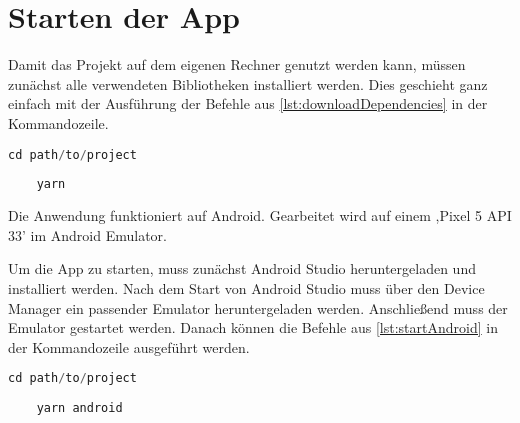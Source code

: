 \chapter{Starten der App}
Damit das Projekt auf dem eigenen Rechner genutzt werden kann, müssen zunächst alle verwendeten Bibliotheken installiert werden. Dies geschieht ganz einfach mit der Ausführung der Befehle aus \autoref{lst:downloadDependencies} in der Kommandozeile.

\begin{lstlisting}[caption={Diese Befehle müssen in die Kommandozeile eingegeben und anschließend ausgeführt werden, damit das Projekt verwendet werden kann. So werden die notwendigen Bibliotheken installiert.},captionpos=b, language=Java, label=lst:downloadDependencies]
	cd path/to/project
	
	yarn
\end{lstlisting}


Die Anwendung funktioniert auf Android. Gearbeitet wird auf einem ,Pixel 5 API 33' im Android Emulator.

Um die App zu starten, muss zunächst Android Studio heruntergeladen und installiert werden. Nach dem Start von Android Studio muss über den Device Manager ein passender Emulator heruntergeladen werden. Anschließend muss der Emulator gestartet werden. Danach können die Befehle aus \autoref{lst:startAndroid} in der Kommandozeile ausgeführt werden.
\begin{lstlisting}[caption={Um die Anwendung mit mit Android zu starten, sollte Android Studio heruntergeladen und installiert sein. Anschließend muss der passende Emulator über den Device Manager hinzugefügt und gestartet werden. Danach werden diese Befehle in die Kommandozeile eingegeben und ausgeführt.},captionpos=b, language=Java, label=lst:startAndroid]
	cd path/to/project
	
	yarn android
\end{lstlisting}